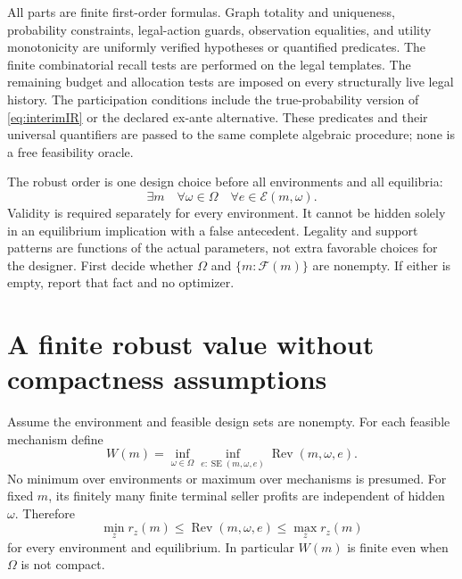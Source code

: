 \documentclass[11pt,a4paper]{article}
\numberwithin{equation}{section}
\theoremstyle{definition}
\newcommand{\cE}{\mathcal E}
\DeclareMathOperator{\SE}{SE}
\DeclareMathOperator{\Rev}{Rev}
\begin{document}
All parts are finite first-order formulas.
Graph totality and uniqueness, probability constraints, legal-action
guards, observation equalities, and utility monotonicity are uniformly
verified hypotheses or quantified predicates.
The finite combinatorial recall tests are performed on the legal
templates. The remaining budget and allocation tests are imposed
on every structurally live legal history.
The participation conditions include the true-probability version of
\eqref{eq:interimIR} or the declared ex-ante alternative.
These predicates and their universal quantifiers are passed to the
same complete algebraic procedure; none is a free feasibility oracle.

The robust order is one design choice before all environments and
all equilibria:
\[
 \exists m\quad\forall\omega\in\Omega\quad
 \forall e\in\cE(m,\omega).
\]
Validity is required separately for every environment.
It cannot be hidden solely in an equilibrium implication with a false
antecedent. Legality and support patterns are functions of the actual
parameters, not extra favorable choices for the designer.
First decide whether \(\Omega\) and \(\{m:\mathcal F(m)\}\) are
nonempty. If either is empty, report that fact and no optimizer.

\section{A finite robust value without compactness assumptions}\label{sec:bounds}
Assume the environment and feasible design sets are nonempty.
For each feasible mechanism define
\[
 W(m)=\inf_{\omega\in\Omega}\inf_{e:\SE(m,\omega,e)}
                       \Rev(m,\omega,e).
\]
No minimum over environments or maximum over mechanisms is presumed.
For fixed \(m\), its finitely many finite terminal seller profits
are independent of hidden \(\omega\). Therefore
\begin{equation}\label{eq:leafbounds}
 \min_z r_z(m)\le\Rev(m,\omega,e)\le\max_z r_z(m)
\end{equation}
for every environment and equilibrium.
In particular \(W(m)\) is finite even when \(\Omega\) is not compact.
\end{document}
